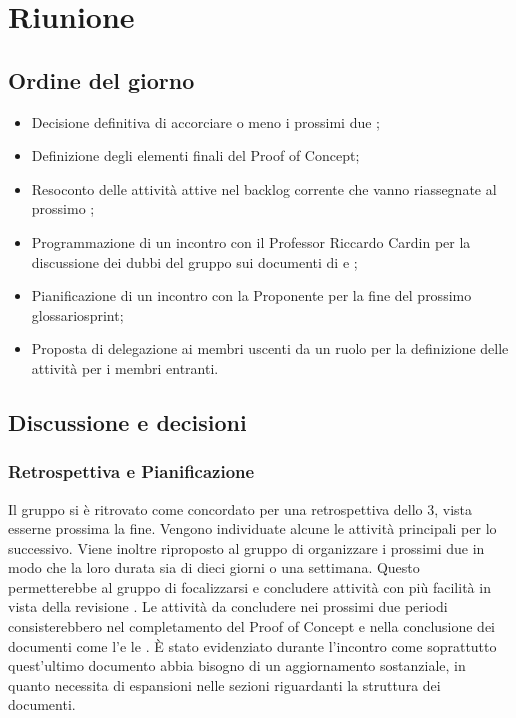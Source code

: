\section{Riunione}
\subsection{Ordine del giorno}
\begin{itemize}
	\item Decisione definitiva di accorciare o meno i prossimi  due ;
	\item Definizione degli elementi finali del Proof of Concept;
	\item Resoconto delle attività attive nel backlog corrente che vanno riassegnate al prossimo ;
	\item Programmazione di un incontro con il Professor Riccardo Cardin per la discussione dei dubbi del gruppo sui documenti di \AdR e \PdQ;
	\item Pianificazione di un incontro con la Proponente per la fine del prossimo glossario{sprint};
	\item Proposta di delegazione ai membri uscenti da un ruolo per la definizione delle attività per i membri entranti.
\end{itemize}

\subsection{Discussione e decisioni}
\subsubsection{Retrospettiva e Pianificazione}
\par Il gruppo si è ritrovato come concordato per una retrospettiva dello  3, vista esserne prossima la fine. Vengono individuate alcune le attività principali per lo  successivo. 
Viene inoltre riproposto al gruppo di organizzare i prossimi due  in modo che la loro durata sia di dieci giorni o una settimana. 
Questo permetterebbe al gruppo di focalizzarsi e concludere attività con più facilità in vista della revisione \RTB.
Le attività da concludere nei prossimi due periodi consisterebbero nel completamento del Proof of Concept e nella conclusione dei documenti come l'\AdR e le \NdP.
È stato evidenziato durante l'incontro come soprattutto quest'ultimo documento abbia bisogno di un aggiornamento sostanziale, in quanto necessita di espansioni nelle sezioni riguardanti la struttura dei documenti.

